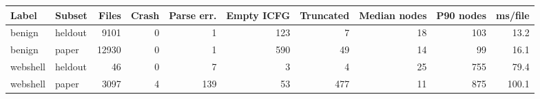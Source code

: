 \begin{tabular}{@{}llrrrrrrrr@{}}
\toprule
Label & Subset & Files & Crash & Parse err. & Empty ICFG & Truncated & Median nodes & P90 nodes & ms/file \\ \midrule
benign & heldout & 9101 & 0 & 1 & 123 & 7 & 18 & 103 & 13.2 \\
benign & paper & 12930 & 0 & 1 & 590 & 49 & 14 & 99 & 16.1 \\
webshell & heldout & 46 & 0 & 7 & 3 & 4 & 25 & 755 & 79.4 \\
webshell & paper & 3097 & 4 & 139 & 53 & 477 & 11 & 875 & 100.1 \\
\bottomrule
\end{tabular}

